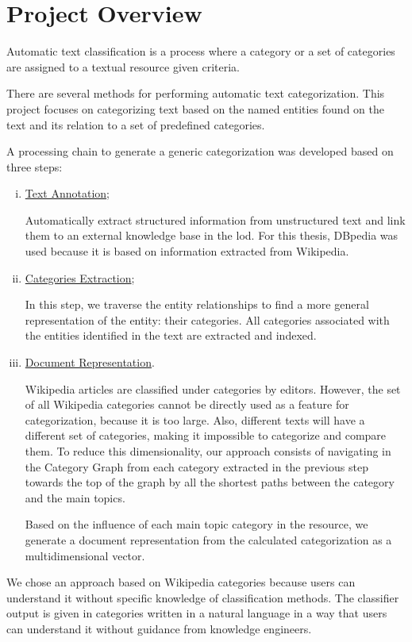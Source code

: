 \section{\hspace*{3pt} Project Overview}

Automatic text classification is a process where a category or a set of categories are assigned to a textual resource given criteria.

There are several methods for performing automatic text categorization. This project focuses on categorizing text based on the named entities found on the text and its relation to a set of predefined categories.

A processing chain to generate a generic categorization was developed based on three steps:

\begin{enumerate}[(i)]
\item \hyperref[sec:text-annotation]{Text Annotation};

Automatically extract structured information from unstructured text and link them to an external knowledge base in the \gls{lod}. For this thesis, DBpedia was used because it is based on information extracted from Wikipedia.

\item \hyperref[sec:categories-extraction]{Categories Extraction};

In this step, we traverse the entity relationships to find a more general representation of the entity: their categories. All categories associated with the entities identified in the text are extracted and indexed.

\item \hyperref[sec:doc-representation]{Document Representation}.

Wikipedia articles are classified under categories by editors. However, the set of all Wikipedia categories cannot be directly used as a feature for categorization, because it is too large. Also,  different texts will have a different set of categories, making it impossible to categorize and compare them. To reduce this dimensionality, our approach consists of navigating in the Category Graph from each category extracted in the previous step towards the top of the graph by all the shortest paths between the category and the main topics. 

Based on the influence of each main topic category in the resource, we generate a document representation from the calculated categorization as a multidimensional vector.

\end{enumerate}
We chose an approach based on Wikipedia categories because users can understand it without specific knowledge of classification methods. The classifier output is given in categories written in a natural language in a way that users can understand it without guidance from knowledge engineers. 



